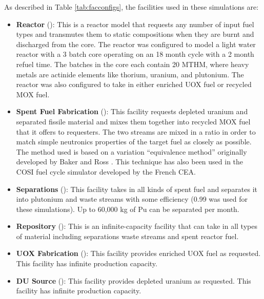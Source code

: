 As described in Table \ref{tab:facconfigs}, the facilities used in these simulations are:
\begin{itemize}

    \item \textbf{Reactor} (): This is a reactor
        model that requests any number of input fuel types and transmutes them
        to static compositions when they are burnt and discharged from the
        core. The reactor was configured to model a light water reactor
        with a 3 batch core operating on an 18 month
        cycle with a 2 month refuel time.  The batches in the core each contain 
        20 \gls{MTHM}, where heavy metals are actinide elements like thorium, 
        uranium, and plutonium. The reactor was also configured to
        take in either enriched \gls{UOX} fuel or recycled \gls{MOX} fuel.

    \item \textbf{Spent Fuel Fabrication} (): This
        facility requests depleted uranium and separated fissile material and
        mixes them together into recycled \gls{MOX} fuel that it offers to
        requesters.  The two streams are mixed in a ratio in order to match
        simple neutronics properties of the target fuel as closely as
        possible.  The method used is based on a variation ``equivalence
        method'' originally developed by Baker and Ross
        \cite{baker_comparison_1963}.  This technique has also been used in the
        \gls{COSI} fuel cycle simulator developed by the French \gls{CEA}.

    \item \textbf{Separations} (): This facility
        takes in all kinds of spent fuel and separates it into plutonium and
        waste streams with some efficiency (0.99 was used for these
        simulations).  Up to 60,000 kg of Pu can be separated per month.

    \item \textbf{Repository} (): This is an
        infinite-capacity facility that can take in all types of material
        including separations waste streams and spent reactor fuel.

    \item \textbf{UOX Fabrication} (): This facility
        provides enriched \gls{UOX} fuel as requested.  This facility has infinite
        production capacity.

    \item \textbf{DU Source} (): This facility
        provides depleted uranium as requested. This facility has infinite
        production capacity.

\end{itemize}

